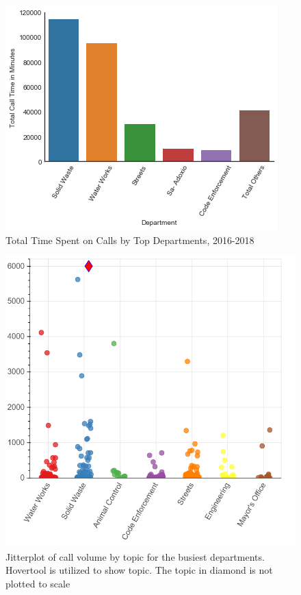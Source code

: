 \documentclass{article}
\begin{document}
\begin{figure}[p]
	\includegraphics[scale=.6]{Calls_Department.png}
	\caption{Total Time Spent on Calls by Top Departments, 2016-2018}
\end{figure}

\begin{figure}[p]
  \includegraphics[scale=0.25]{jitterplot.png}
  \caption{Jitterplot of call volume by topic for the busiest departments.  Hovertool is utilized to show topic.  The topic in diamond is not plotted to scale}
\end{figure}
\end{document}
